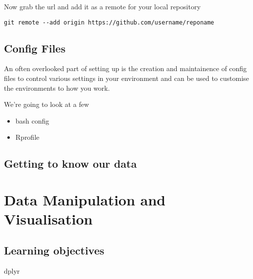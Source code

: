\documentclass[]{book}
\providecommand{\tightlist}{%
  \setlength{\itemsep}{0pt}\setlength{\parskip}{0pt}}
\begin{document}
Now grab the url and add it as a remote for your local repository

\begin{verbatim}
git remote --add origin https://github.com/username/reponame
\end{verbatim}

\hypertarget{config-files}{%
\section{Config Files}\label{config-files}}

An often overlooked part of setting up is the creation and maintainence
of config files to control various settings in your environment and can
be used to customise the environments to how you work.

We're going to look at a few

\begin{itemize}
\tightlist
\item
  bash config
\item
  Rprofile
\end{itemize}

\hypertarget{getting-to-know-our-data}{%
\section{Getting to know our data}\label{getting-to-know-our-data}}

\hypertarget{data-manipulation-and-visualisation}{%
\chapter{Data Manipulation and
Visualisation}\label{data-manipulation-and-visualisation}}

\hypertarget{learning-objectives}{%
\section{Learning objectives}\label{learning-objectives}}

dplyr
\end{document}
